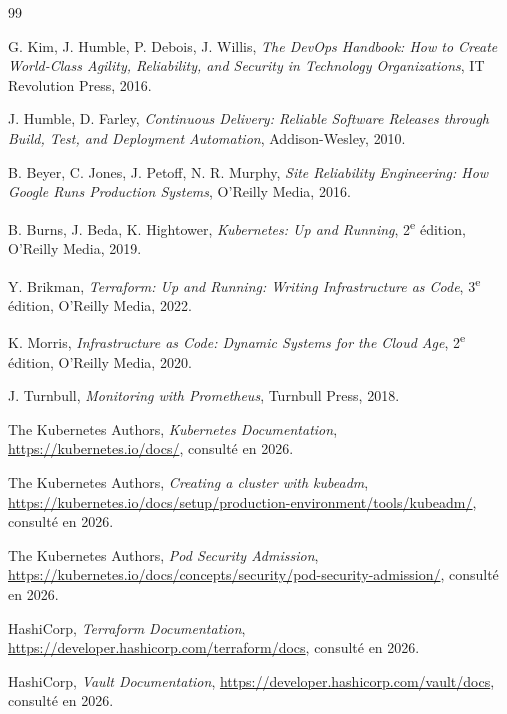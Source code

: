 \documentclass[12pt,a4paper,oneside]{report}
\begin{document}
\begin{thebibliography}{99}

 G. Kim, J. Humble, P. Debois, J. Willis,
\emph{The DevOps Handbook: How to Create World-Class Agility, Reliability, and Security in Technology Organizations},
IT Revolution Press, 2016.

 J. Humble, D. Farley,
\emph{Continuous Delivery: Reliable Software Releases through Build, Test, and Deployment Automation},
Addison-Wesley, 2010.

 B. Beyer, C. Jones, J. Petoff, N. R. Murphy,
\emph{Site Reliability Engineering: How Google Runs Production Systems},
O'Reilly Media, 2016.

 B. Burns, J. Beda, K. Hightower,
\emph{Kubernetes: Up and Running}, 2\textsuperscript{e} édition, O'Reilly Media, 2019.

 Y. Brikman,
\emph{Terraform: Up and Running: Writing Infrastructure as Code}, 3\textsuperscript{e} édition,
O'Reilly Media, 2022.

 K. Morris,
\emph{Infrastructure as Code: Dynamic Systems for the Cloud Age}, 2\textsuperscript{e} édition,
O'Reilly Media, 2020.

 J. Turnbull,
\emph{Monitoring with Prometheus}, Turnbull Press, 2018.

 The Kubernetes Authors, \emph{Kubernetes Documentation},
\url{https://kubernetes.io/docs/}, consulté en 2026.

 The Kubernetes Authors,
\emph{Creating a cluster with kubeadm},
\url{https://kubernetes.io/docs/setup/production-environment/tools/kubeadm/}, consulté en 2026.

 The Kubernetes Authors, \emph{Pod Security Admission},
\url{https://kubernetes.io/docs/concepts/security/pod-security-admission/}, consulté en 2026.

 HashiCorp, \emph{Terraform Documentation},
\url{https://developer.hashicorp.com/terraform/docs}, consulté en 2026.

 HashiCorp, \emph{Vault Documentation},
\url{https://developer.hashicorp.com/vault/docs}, consulté en 2026.


\end{thebibliography}
\end{document}
